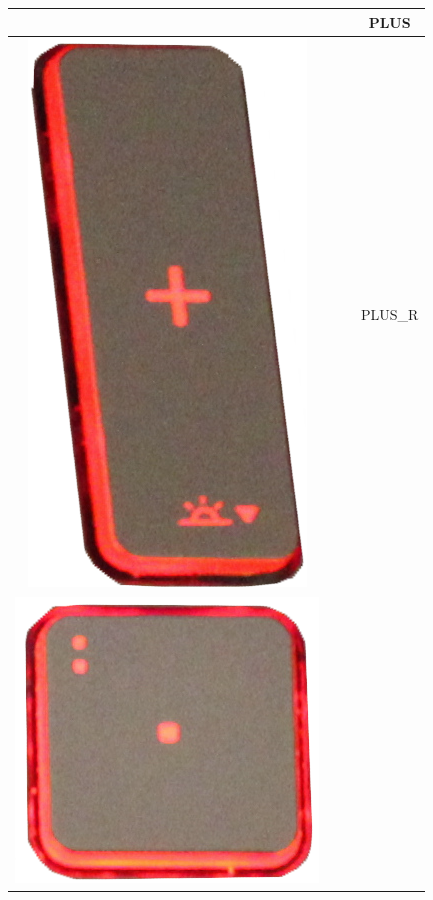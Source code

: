 \begin{longtable}{cccc}
\begin{minipage}[c]{.3\textwidth}
\vspace{0.2cm}
\end{minipage} & & & PLUS\\
\hline
\begin{minipage}[c]{.3\textwidth}
\vspace{0.2cm}
\includegraphics[scale=0.1]{Images/KeyMapping/PLUS_R}
\vspace{0.2cm}
\end{minipage} & & & PLUS\_R\\
\hline
\begin{minipage}[c]{.3\textwidth}
\vspace{0.2cm}
\includegraphics[scale=0.1]{Images/KeyMapping/POINT}

\end{minipage}
\end{longtable}
